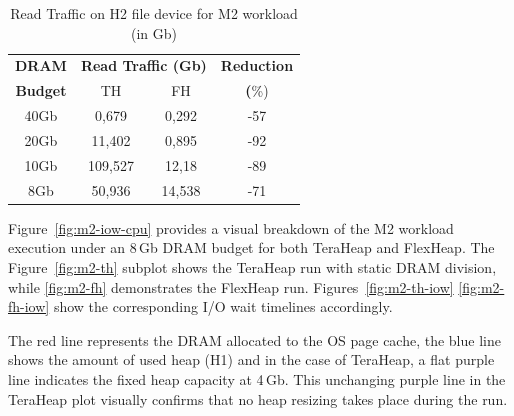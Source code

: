 \begin{table}[h]
\centering
\caption{Read Traffic on H2 file device for M2 workload (in Gb)}
\label{tab:m2-traffic}
\begin{tabular}{|c|cc|c|}
\hline
\textbf{DRAM} & \multicolumn{2}{c|}{\textbf{Read Traffic (Gb)}} & \textbf{Reduction} \\
\textbf{Budget} & TH & FH & \textbf(\%)\\
\hline
40Gb & 0,679 & 0,292 & -57 \\ 
20Gb & 11,402 & 0,895 & -92 \\
10Gb & 109,527 & 12,18 & -89 \\
8Gb  & 50,936 & 14,538 & -71 \\
\hline
\end{tabular}
\end{table}

%


Figure~\ref{fig:m2-iow-cpu} provides a visual breakdown of the M2 workload execution under an
8\,Gb DRAM budget for both TeraHeap and FlexHeap. The Figure~\ref{fig:m2-th} subplot shows the TeraHeap run with static DRAM division, 
while \ref{fig:m2-fh} demonstrates the FlexHeap run. Figures~\ref{fig:m2-th-iow} \ref{fig:m2-fh-iow} show the corresponding I/O wait timelines accordingly.

The red line represents the DRAM allocated to the OS page cache, the blue line shows the
amount of used heap (H1) and in the case of TeraHeap, a flat purple line indicates the fixed heap capacity at 4\,Gb. 
This unchanging purple line in the TeraHeap plot visually confirms that no heap resizing takes place during the run. 

